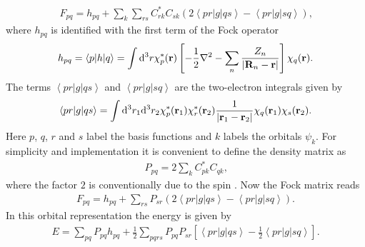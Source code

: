 \documentclass[twoside,        %
			   11pt,			%
               BCOR10mm,       %
               ngerman,english  %
               ]{scrartcl}
\begin{document}
\begin{align*}
F_{pq} = h_{pq} + \sum\limits_k \sum\limits_{rs} C_{rk}^* C_{sk} \left( 2 \left<pr|g|qs\right> -  \left<pr|g|sq\right> \right)\text{,}
\end{align*} where $h_{pq}$ is identified with the first term of the Fock operator
\begin{align*}
h_{pq} = \left< p|h|q\right> = \int \mathrm{d}^3 r \chi_p^*(\mathbf{r})\left[ -\frac{1}{2} \nabla^2 - \sum\limits_n \frac{Z_n}{\left| \mathbf{R}_n -\mathbf{r} \right|} \right]\chi_q(\mathbf{r})\text{.}
\end{align*} The terms $\left<pr|g|qs\right>$ and $\left<pr|g|sq\right>$ are the two-electron integrals given by
\begin{align*}
\left<pr|g|qs\right> = \int \mathrm{d}^3 r_1 \mathrm{d}^3 r_2 \chi_p^*(\mathbf{r}_1) \chi_r^*(\mathbf{r}_2) \frac{1}{\left| \mathbf{r}_1 -\mathbf{r}_2 \right|} \chi_q(\mathbf{r}_1) \chi_s(\mathbf{r}_2) \text{.}
\end{align*} Here $p$, $q$, $r$ and $s$ label the basis functions and $k$ labels the orbitals $\psi_k$.
For simplicity and implementation it is convenient to define the density matrix as
\begin{align*}
P_{pq} = 2\sum\limits_k C_{pk}^* C_{qk} \text{,}
\end{align*} where the factor $2$ is conventionally due to the spin \cite{Thijssen2007}.
Now the Fock matrix reads
\begin{align*}
F_{pq} = h_{pq} + \sum\limits_{rs} P_{sr} \left( 2 \left<pr|g|qs\right> -  \left<pr|g|sq\right> \right)\text{.}
\end{align*} In this orbital representation the energy is given by
\begin{align*}
E = \sum\limits_{pq} P_{pq}h_{pq} + \frac{1}{2}  \sum\limits_{pqrs} P_{pq}P_{sr} \left[ \left<pr|g|qs\right> -  \frac{1}{2}\left<pr|g|sq\right> \right] \text{.}
\end{align*}
\end{document}
